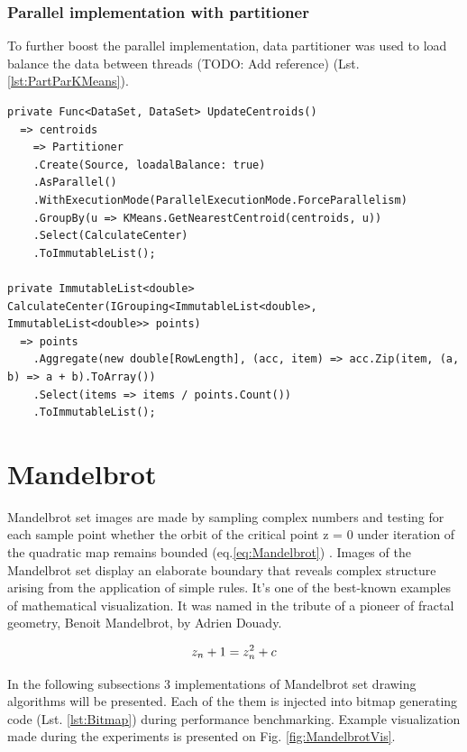 \subsubsection{Parallel implementation with partitioner}

To further boost the parallel implementation, data partitioner was used to load balance the data between threads (TODO: Add reference) (Lst. \ref{lst:PartParKMeans}). 

\begin{lstlisting}[style=sharpcstyle, caption={Parallel k-means algorithm with partitioner}, label={lst:PartParKMeans}]
private Func<DataSet, DataSet> UpdateCentroids()
  => centroids 
    => Partitioner
    .Create(Source, loadalBalance: true)
    .AsParallel()
    .WithExecutionMode(ParallelExecutionMode.ForceParallelism)
    .GroupBy(u => KMeans.GetNearestCentroid(centroids, u))
    .Select(CalculateCenter)
    .ToImmutableList();

private ImmutableList<double> CalculateCenter(IGrouping<ImmutableList<double>, ImmutableList<double>> points) 
  => points
    .Aggregate(new double[RowLength], (acc, item) => acc.Zip(item, (a, b) => a + b).ToArray())
    .Select(items => items / points.Count())
    .ToImmutableList();
\end{lstlisting}

\clearpage
\section{Mandelbrot}
\label{sec: MandelbrotImp}

Mandelbrot set images are made by sampling complex numbers and testing for each sample point whether the orbit of the critical point z = 0 under iteration of the quadratic map remains bounded (eq.\ref{eq:Mandelbrot}) \cite{MandelbrotExplorer}. Images of the Mandelbrot set display an elaborate boundary that reveals complex structure arising from the application of simple rules. It's one of the best-known examples of mathematical visualization. It was named in the tribute of a pioneer of fractal geometry, Benoit Mandelbrot, by Adrien Douady. \cite{Douady}

\begin{equation}
\centering 
z_n + 1 = z_n^2 + c
\label{eq:Mandelbrot}
\end{equation}

In the following subsections 3 implementations of Mandelbrot set drawing algorithms will be presented. Each of the them is injected into bitmap generating code (Lst. \ref{lst:Bitmap}) during performance benchmarking. Example visualization made during the experiments is presented on Fig. \ref{fig:MandelbrotVis}.

